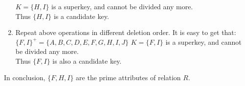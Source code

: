 \documentclass[12pt,letterpaper,titlepage,en-US]{article}
\begin{document}
\begin{homeworkProblem}
\begin{homeworkSubProblem}
\begin{enumerate}[label=\textbf{Step {\arabic*}}, leftmargin=2cm]
                $K = \{H,I\}$ is a superkey, and cannot be divided any more.\\
                Thus $\{H, I\}$ is a candidate key.
            \item Repeat above operations in different deletion order. It is easy to get that:$\{F,I\}^+ = \{A,B,C,D,E,F,G,H,I,J\}$
                $K = \{F,I\}$ is a superkey, and cannot be divided any more.\\
                Thus $\{F, I\}$ is also a candidate key.
        \end{enumerate}
        In conclusion, $\{F, H, I\}$ are the prime attributes of relation $R$.

    \end{homeworkSubProblem}

    \begin{homeworkSubProblem}

    \end{homeworkSubProblem}
\end{homeworkProblem}
\end{document}
